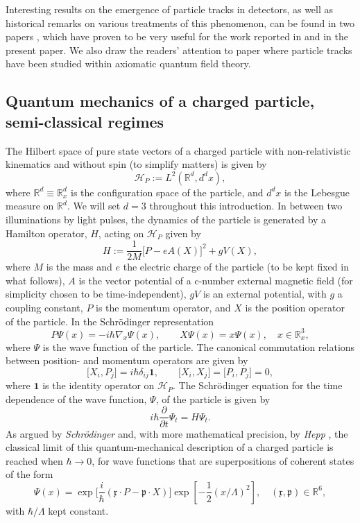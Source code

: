 \documentclass[12pt]{article}
\begin{document}
Interesting results on the emergence of particle tracks in detectors, as well as historical remarks 
on various treatments of this phenomenon, can be found in two papers \cite{FT1, FT2}, which 
have proven to be very useful for the work reported in \cite{BBFF} and in the present paper. 
We also draw the readers' attention to paper \cite{Steinmann} where particle tracks have been studied 
within axiomatic quantum field theory.


\subsection{Quantum mechanics of a charged particle, semi-classical regimes}
The Hilbert space of pure state vectors of a charged particle with non-relativistic kinematics and 
without spin (to simplify matters) is given by 
\begin{equation}\label{Hilbert space}
\mathcal{H}_P := L^{2}(\mathbb{R}^{d}, d^{d}x),
\end{equation}
where $\mathbb{R}^{d}\equiv \mathbb{R}^{d}_{x}$ is the configuration space of the particle, and $d^{d}x$ 
is the Lebesgue measure on $\mathbb{R}^{d}$. We will set $d=3$ throughout this introduction.
In between two illuminations by light pulses, the dynamics of the particle is generated by a Hamilton operator, 
$H$, acting on $\mathcal{H}_P$ given by
\begin{equation}\label{Hamiltonian}
H := \frac{1}{2M}\big[P- eA(X)\big]^{2} + gV(X),
\end{equation}
where $M$ is the mass and $e$ the electric charge of the particle (to be kept fixed in what follows), 
$A$ is the vector potential of a \mbox{c-number} external magnetic field (for simplicity chosen to be 
time-independent), $gV$ is an external potential, with $g$ a coupling constant, $P$ is the momentum 
operator, and $X$ is the position operator of the particle. In the Schr\"odinger representation
$$P\Psi(x) = - i \hbar \nabla_{x} \Psi(x), \qquad X\Psi(x) = x\Psi(x), \quad x\in \mathbb{R}^{3}_{x},$$ 
where $\Psi$ is the wave function of the particle. The canonical commutation relations between position- 
and momentum operators are given by
\begin{equation}\label{CCR}
\big[X_i, P_j \big] = i \hbar \delta_{ij} \mathbf{1}, \qquad \big[X_i, X_j\big]=\big[P_i, P_j\big]=0,
\end{equation}
where $\mathbf{1}$ is the identity operator on $\mathcal{H}_P$.
The Schr\"odinger equation for the time dependence of the wave function, $\Psi$, of the particle is given by
\begin{equation}\label{Schrodinger}
i\hbar \frac{\partial}{\partial t} \Psi_{t}= H \Psi_{t}.
\end{equation}
As argued by \textit{Schr\"odinger} \cite{Schrod} and, with more mathematical precision, by 
\textit{Hepp} \cite{Hepp}, the classical limit of this quantum-mechanical description of a charged particle is reached when 
$\hbar \rightarrow 0$, for wave functions that are superpositions of coherent states of the form 
$$\Psi(x)= \exp\Big[\frac{i}{\hbar} (\mathfrak{x}\cdot P-\mathfrak{p}\cdot X)\Big] \exp[-\frac{1}{2} (x/\Lambda)^{2}], \quad (\mathfrak{x}, \mathfrak{p})\in \mathbb{R}^{6},$$
with $\hbar/\Lambda$ kept constant.
\end{document}
